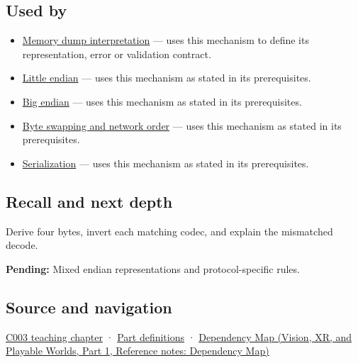 \subsection{Used by}\label{appendix-bc07c3d25b18-used-by}

\hypertarget{appendix-bc07c3d25b18-used-by}{}

\begin{itemize}
\item
  \hyperref[appendix-230b59c0676b]{Memory dump interpretation} --- uses this mechanism to define its representation, error or validation contract.
\item
  \hyperref[appendix-367b6abf460e]{Little endian} --- uses this mechanism as stated in its prerequisites.
\item
  \hyperref[appendix-92e040df969a]{Big endian} --- uses this mechanism as stated in its prerequisites.
\item
  \hyperref[appendix-11ba36693aa2]{Byte swapping and network order} --- uses this mechanism as stated in its prerequisites.
\item
  \hyperref[appendix-91d09ebed979]{Serialization} --- uses this mechanism as stated in its prerequisites.
\end{itemize}

\subsection{Recall and next depth}\label{appendix-bc07c3d25b18-recall-and-next-depth}

\hypertarget{appendix-bc07c3d25b18-recall-and-next-depth}{}

Derive four bytes, invert each matching codec, and explain the mismatched decode.

\textbf{Pending:} Mixed endian representations and protocol-specific rules.

\subsection{Source and navigation}\label{appendix-bc07c3d25b18-source-and-navigation}

\hypertarget{appendix-bc07c3d25b18-source-and-navigation}{}

\hyperref[01-foundations-i-ch002-where-the-bytes-live]{C003 teaching chapter} · \hyperref[appendix-fd090d982a15-m003---parts-41-60]{Part definitions} · \href{../07-Vision-XR-and-Playable-Worlds-P01/main.pdf\#nameddest=appendix-4ad47bdd269a}{Dependency Map (Vision, XR, and Playable Worlds, Part 1, Reference notes: Dependency Map)}
